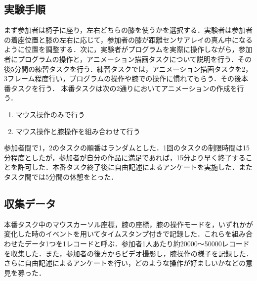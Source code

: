 \documentclass[submit, techrep]{ipsj}
\begin{document}
\subsection{実験手順}
まず参加者は椅子に座り，左右どちらの膝を使うかを選択する．実験者は参加者の着座位置と膝の左右に応じて，参加者の膝が距離センサアレイの真ん中になるように位置を調整する．次に，実験者がプログラムを実際に操作しながら，参加者にプログラムの操作と，アニメーション描画タスクについて説明を行う．その後5分間の練習タスクを行う．練習タスクでは，アニメーション描画タスクを2，3フレーム程度行い，プログラムの操作や膝での操作に慣れてもらう．その後本番タスクを行う．
本番タスクは次の2通りにおいてアニメーションの作成を行う．
\begin{enumerate}
	\item マウス操作のみで行う
	\item マウス操作と膝操作を組み合わせて行う
\end{enumerate}
参加者間で1，2のタスクの順番はランダムとした．1回のタスクの制限時間は15分程度としたが，参加者が自分の作品に満足であれば，15分より早く終了することを許可した．本番タスク終了後に自由記述によるアンケートを実施した．またタスク間では5分間の休憩をとった．
\subsection{収集データ}
本番タスク中のマウスカーソル座標，膝の座標，膝の操作モードを，いずれかが変化した時のイベントを用いてタイムスタンプ付きで記録した．これらを組み合わせたデータ1つを1レコードと呼ぶ．参加者1人あたり約20000〜50000レコードを収集した．また，参加者の後方からビデオ撮影し，膝操作の様子を記録した．さらに自由記述によるアンケートを行い，どのような操作が好ましいかなどの意見を募った．
\end{document}
